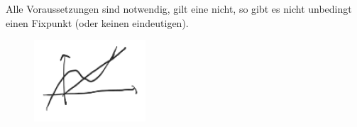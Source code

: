 Alle Voraussetzungen sind notwendig, gilt eine nicht, so gibt es nicht unbedingt einen Fixpunkt (oder keinen eindeutigen).
\begin{figure}[H]
    \centering
    \includegraphics[width=0.3\linewidth]{figures/kein_eindeutiger_fixpunkt}
    \label{fig:kein_eindeutiger_fixpunkt}
\end{figure}



